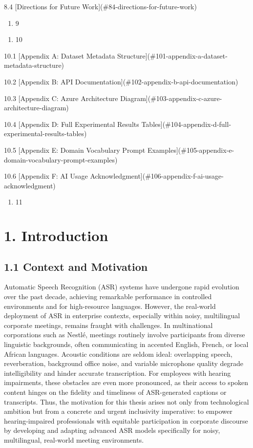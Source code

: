\documentclass[12pt,a4paper]{article}
\begin{document}
8.4 [Directions for Future Work](\#84-directions-for-future-work)

\begin{enumerate}
  \item 9
\end{enumerate}

\begin{enumerate}
  \item 10
\end{enumerate}

10.1 [Appendix A: Dataset Metadata Structure](\#101-appendix-a-dataset-metadata-structure)

10.2 [Appendix B: API Documentation](\#102-appendix-b-api-documentation)

10.3 [Appendix C: Azure Architecture Diagram](\#103-appendix-c-azure-architecture-diagram)

10.4 [Appendix D: Full Experimental Results Tables](\#104-appendix-d-full-experimental-results-tables)

10.5 [Appendix E: Domain Vocabulary Prompt Examples](\#105-appendix-e-domain-vocabulary-prompt-examples)

10.6 [Appendix F: AI Usage Acknowledgment](\#106-appendix-f-ai-usage-acknowledgment)


\begin{enumerate}
  \item 11
\end{enumerate}






\section{1. Introduction}


\subsection{1.1 Context and Motivation}


Automatic Speech Recognition (ASR) systems have undergone rapid evolution over the past decade, achieving remarkable performance in controlled environments and for high-resource languages. However, the real-world deployment of ASR in enterprise contexts, especially within noisy, multilingual corporate meetings, remains fraught with challenges. In multinational corporations such as Nestlé, meetings routinely involve participants from diverse linguistic backgrounds, often communicating in accented English, French, or local African languages. Acoustic conditions are seldom ideal: overlapping speech, reverberation, background office noise, and variable microphone quality degrade intelligibility and hinder accurate transcription. For employees with hearing impairments, these obstacles are even more pronounced, as their access to spoken content hinges on the fidelity and timeliness of ASR-generated captions or transcripts. Thus, the motivation for this thesis arises not only from technological ambition but from a concrete and urgent inclusivity imperative: to empower hearing-impaired professionals with equitable participation in corporate discourse by developing and adapting advanced ASR models specifically for noisy, multilingual, real-world meeting environments.
\end{document}
